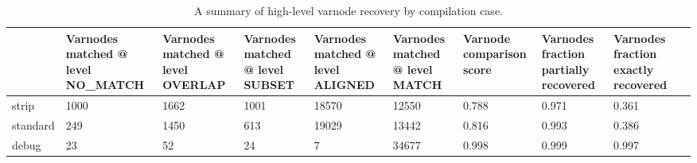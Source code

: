 \begin{table*}[tb]
\centering
\caption{A summary of high-level varnode recovery by compilation case.}
\label{table:opts-varnodes-summary}
\begin{tabular}{lp{1.50cm}p{1.33cm}p{1.33cm}p{1.33cm}p{1.33cm}p{1.33cm}p{1.33cm}p{1.33cm}p{1.33cm}}
\toprule
{} & {Varnodes matched @ level NO\_MATCH} & {Varnodes matched @ level OVERLAP} & {Varnodes matched @ level SUBSET} & {Varnodes matched @ level ALIGNED} & {Varnodes matched @ level MATCH} & {Varnode comparison score} & {Varnodes fraction partially recovered} & {Varnodes fraction exactly recovered} \\
\midrule
strip    &                                               1000 &                                             1662 &                                            1001 &                                            18570 &                                          12550 &                                    0.788 &                                              0.971 &                                              0.361 \\
standard &                                                249 &                                             1450 &                                             613 &                                            19029 &                                          13442 &                                    0.816 &                                              0.993 &                                              0.386 \\
debug    &                                                 23 &                                               52 &                                              24 &                                                7 &                                          34677 &                                    0.998 &                                              0.999 &                                              0.997 \\
\bottomrule
\end{tabular}
\end{table*}
